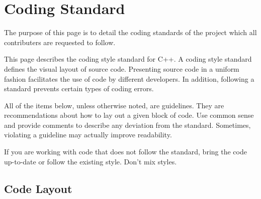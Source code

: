 \chapter{Coding Standard}

The purpose of this page is to detail the coding standards of the project which
all contributers are requested to follow.

This page describes the coding style standard for C++. A coding style standard
defines the visual layout of source code. Presenting source code in a uniform
fashion facilitates the use of code by different developers. In addition,
following a standard prevents certain types of coding errors.

All of the items below, unless otherwise noted, are guidelines. They are
recommendations about how to lay out a given block of code. Use common sense and
provide comments to describe any deviation from the standard. Sometimes,
violating a guideline may actually improve readability.

If you are working with code that does not follow the standard, bring the code
up-to-date or follow the existing style. Don’t mix styles.

\section{Code Layout}

